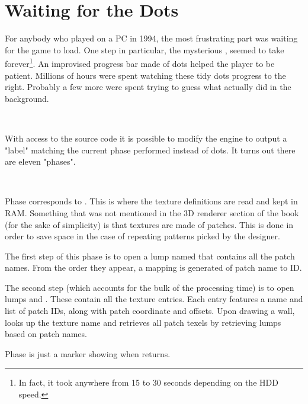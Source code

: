 \section{Waiting for the Dots}
\label{dots_explained}
For anybody who played \doom{} on a PC in 1994, the most frustrating part was waiting for the game to load. One step in particular, the mysterious , seemed to take forever\footnote{In fact, it took anywhere from 15 to 30 seconds depending on the HDD speed.}. An improvised progress bar made of dots helped the player to be patient. Millions of hours were spent watching these tidy dots progress to the right. Probably a few more were spent trying to guess what  actually did in the background.\\
\par
{}\\
\par
With access to the source code it is possible to modify the engine to output a "label" matching the current phase performed instead of dots. It turns out there are eleven "phases".\\
\par
{}\\
\par

Phase  corresponds to . This is where the texture definitions are read and kept in RAM. Something that was not mentioned in the 3D renderer section of the book (for the sake of simplicity) is that textures are made of patches. This is done in order to save space in the case of repeating patterns picked by the designer.\\
\par
The first step of this phase is to open a lump named  that contains all the patch names. From the order they appear, a mapping is generated of patch name to ID.\\
\par
The second step (which accounts for the bulk of the processing time) is to open lumps  and . These contain all the texture entries. Each entry features a name and list of patch IDs, along with patch coordinate and offsets. Upon drawing a wall, \doom{} looks up the texture name and retrieves all patch texels by retrieving lumps based on patch names.\\
\par
Phase  is just a marker showing when  returns.\\
\par

